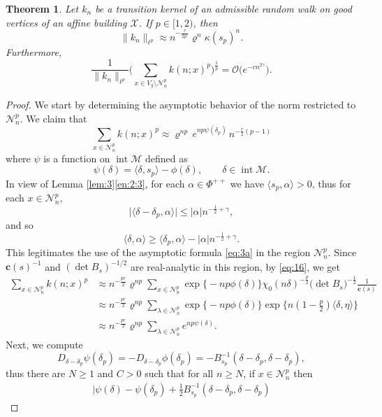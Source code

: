 \documentclass[11pt]{amsart}
\newcommand{\calO}{\mathcal{O}}
\newcommand{\calM}{\mathcal{M}}
\newcommand{\calN}{\mathcal{N}}
\newcommand{\scrX}{\mathscr{X}}
\newcommand{\scrN}{\mathscr{N}}
\newcommand{\bfc}{\mathbf{c}}
\newcommand{\sprod}[2]{\langle {#1}, {#2} \rangle}
\newcommand{\inter}{\operatorname{int}}
\theoremstyle{plain}
\newcounter{thm}
\newtheorem{theorem}{Theorem}[section]
\theoremstyle{definition}
\numberwithin{equation}{section}
\begin{document}
\begin{theorem}
	\label{thm:1}
	Let $k_n$ be a transition kernel of an admissible random walk on good vertices of an affine building $\scrX$.
	If $p \in [1, 2)$, then
	\[
		\|k_n \|_{\ell^p}
		\approx 
		n^{-\frac{r}{2p'}} 
		\varrho^{n} \kappa(s_p)^n.
	\]
	Furthermore,
	\[
		\frac{1}{\| k_n\|_{\ell^p}}
		\bigg( \sum_{x \in V_g \setminus \scrN_n^p} k(n; x)^p\bigg)^{\frac{1}{p}}
		= \calO\Big(e^{-c n^{2\gamma}} \Big).
	\]
\end{theorem}
\begin{proof}
	We start by determining the asymptotic behavior of the norm restricted to $\scrN_n^p$. We claim that
	\[
		\sum_{x \in \scrN_n^p} k(n;x)^p 
		\approx \varrho^{np}\, e^{np\psi(\delta_p)}\, n^{-\frac{r}{2}(p-1)}
	\]
	where $\psi$ is a function on $\inter \calM$ defined as
	\[
		\psi(\delta)=\langle \delta, s_p \rangle-\phi(\delta), \qquad \delta \in \inter \calM.
	\]
	In view of Lemma \ref{lem:3}\eqref{en:2:3}, for each $\alpha \in \Phi^{++}$ we have $\sprod{s_p}{\alpha} > 0$, thus
	for each $x \in \scrN_n^p$,
	\[
		\big|\sprod{\delta - \delta_p}{\alpha}\big|
		\leqslant
		|\alpha| n^{-\frac{1}{2}+\gamma},
	\]
	and so
	\[
		\sprod{\delta}{\alpha} \geqslant \sprod{\delta_p}{\alpha} - |\alpha| n^{-\frac{1}{2} + \gamma}.
	\]
	This legitimates the use of the asymptotic formula \eqref{eq:3a} in the region $\scrN_n^p$. Since
	$\bfc(s)^{-1}$ and $(\det B_{s})^{-1/2}$ are real-analytic in this region, by \eqref{eq:16}, we get
	\begin{align*}
		\sum_{x\in \scrN_n^p} k(n; x)^p
		&\approx
		n^{-\frac{pr}{2}} \varrho^{np} 
		\sum_{x \in \scrN_n^p} 
		\exp\big\{-np\phi(\delta)\big\} \chi_0(n \delta)^{-\frac{p}{2}} \big(\det B_s\big)^{-\frac{1}{2}}
		\frac{1}{\bfc(s)} \\
		&\approx
		n^{-\frac{pr}{2}} \varrho^{np} 
		\sum_{\lambda \in \calN_n^p}
		\exp\big\{-np\phi(\delta)\big\} \exp\Big\{ n \left( 1-\frac{p}{2}\right) \sprod{\delta}{\eta}\Big\} \\
		&\approx 
		n^{-\frac{pr}{2}} \varrho^{np} 
		\sum_{\lambda \in \calN_n^p}
		e^{n p \psi(\delta)}.
	\end{align*}
	Next, we compute
	\[
		D_{\delta-\delta_p} \psi(\delta_p) 
		=
		-D_{\delta-\delta_p} \phi(\delta_p) = -B^{-1}_{s_p}(\delta - \delta_p, \delta-\delta_p),
	\]
	thus there are $N \geqslant 1$ and $C > 0$ such that for all $n \geqslant N$, if $x \in \scrN_n^p$ then
	\begin{align*}
		\Big| \psi(\delta) - \psi(\delta_p) + \frac{1}{2} 
		B^{-1}_{s_p}(\delta - \delta_p, \delta-\delta_p)

\end{align*}
\end{proof}
\end{document}
